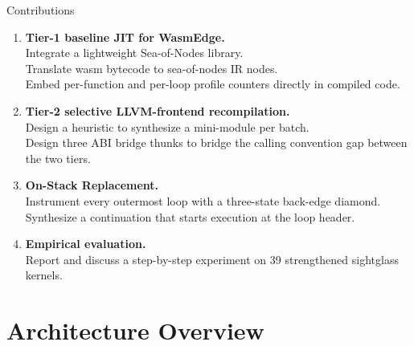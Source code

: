 \documentclass[aspectratio=169,11pt]{beamer}
\newcommand{\tone}{\textbf{\textcolor{tier1}{Tier-1}}}
\newcommand{\ttwo}{\textbf{\textcolor{tier2}{Tier-2}}}
\begin{document}
\begin{frame}{Contributions}
  \small
  \begin{enumerate}\setlength{\itemsep}{0.5em}
    \item \textbf{\tone{} baseline JIT for WasmEdge.}\\
      Integrate a lightweight Sea-of-Nodes library.\\
      Translate wasm bytecode to sea-of-nodes IR nodes.\\
      Embed per-function and per-loop profile counters directly in compiled code.
    \item \textbf{\ttwo{} selective LLVM-frontend recompilation.}\\
      Design a heuristic to synthesize a mini-module per batch.\\
      Design three ABI bridge thunks to bridge the calling convention gap between the two tiers.
    \item \textbf{On-Stack Replacement.}\\
      Instrument every outermost loop with a three-state back-edge diamond.\\
      Synthesize a continuation that starts execution at the loop header.
    \item \textbf{Empirical evaluation.}\\
      Report and discuss a step-by-step experiment on 39 strengthened sightglass kernels.
  \end{enumerate}
\end{frame}

\section{Architecture Overview}
\end{document}
